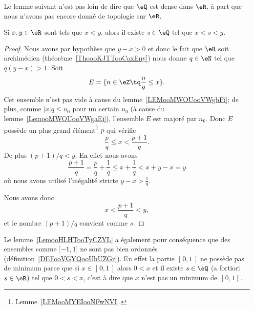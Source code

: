 Le lemme suivant n'est pas loin de dire que \( \eQ\) est dense dans \( \eR\), à part que nous n'avons pas encore donné de topologie sur \( \eR\).
\begin{lemma}       \label{LemooHLHTooTyCZYL}
    Si \( x,y\in \eR\) sont tels que \( x<y\), alors il existe \( s\in \eQ\) tel que \( x<s<y\).
\end{lemma}

\begin{proof}
    Nous avons par hypothèse que \( y-x>0\) et donc le fait que \( \eR\) soit archimédien (théorème~\ref{ThoooKJTTooCaxEny}) nous donne \( q\in \eN\) tel que \( q(y-x)>1\). Soit
    \begin{equation}
        E=\{ n\in \eZ\tq \frac{ n }{ q }\leq x \}.
    \end{equation}
    Cet ensemble n'est pas vide à cause du lemme~\ref{LEMooMWOUooVWgbFi}; de plus, comme \( |x|q \leq n_0\) pour un certain \( n_0 \) (à cause du lemme~\ref{LemooMWOUooVWgaEi}), l'ensemble \( E\) est majoré par \( n_0\). Donc \( E\) possède un plus grand élément\footnote{Lemme~\ref{LEMooMYEIooNFwNVI}.} \( p\) qui vérifie
    \begin{equation}
        \frac{ p }{ q }\leq x<\frac{ p+1 }{ q }.
    \end{equation}
    De plus \( (p+1)/q<y\). En effet nous avons
    \begin{equation}
        \frac{ p+1 }{ q }=\frac{ p }{ q }+\frac{1}{ q }\leq x+\frac{1}{ q }<x+y-x=y
    \end{equation}
    où nous avons utilisé l'inégalité stricte \( y-x>\frac{1}{ q }\).

    Nous avons donc
    \begin{equation}
        x<\frac{ p+1 }{ q }<y,
    \end{equation}
    et le nombre \( (p+1)/q\) convient comme \( s\).
\end{proof}

\begin{remark}      \label{REMooXOIOooHjwMvA}
    Le lemme~\ref{LemooHLHTooTyCZYL} a également pour conséquence que des ensembles comme \( \mathopen[ -1 , 1 \mathclose]\) ne sont pas bien ordonnés (définition~\ref{DEFooVGYQooUhUZGr}). En effet la partie \( \mathopen] 0 , 1 \mathclose[\) ne possède pas de minimum parce que si \( x\in \mathopen] 0 , 1 \mathclose[\) alors \( 0<x\) et il existe \( s\in \eQ\) (a fortiori \( s\in \eR\)) tel que \( 0<s<x\), c'est à dire que \( x\) n'est pas un minimum de \( \mathopen] 0 , 1 \mathclose[\).
\end{remark}


